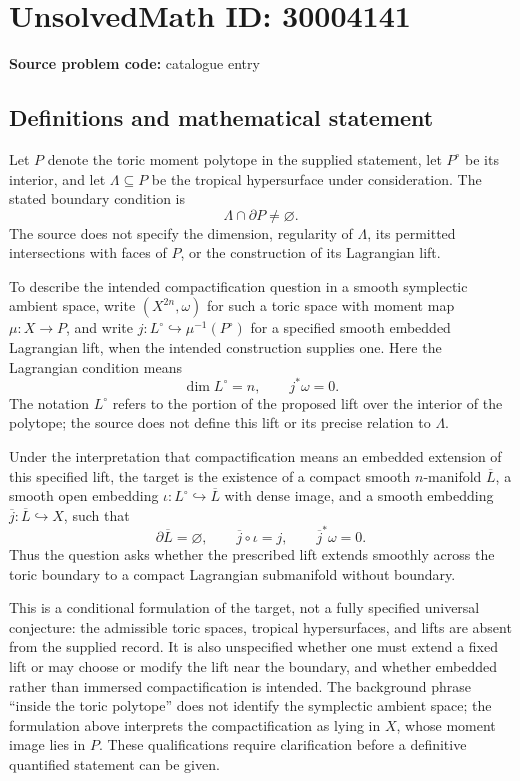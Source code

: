 \documentclass[11pt]{article}
\begin{document}
\section*{UnsolvedMath ID: 30004141}
\textbf{Source problem code:} catalogue entry
\subsection{Definitions and mathematical statement}
Let \(P\) denote the toric moment polytope in the supplied statement, let \(P^{\circ}\) be its interior, and let \(\Lambda\subseteq P\) be the tropical hypersurface under consideration. The stated boundary condition is
\[
\Lambda\cap\partial P\ne\varnothing.
\]
The source does not specify the dimension, regularity of \(\Lambda\), its permitted intersections with faces of \(P\), or the construction of its Lagrangian lift.

To describe the intended compactification question in a smooth symplectic ambient space, write \((X^{2n},\omega)\) for such a toric space with moment map \(\mu:X\to P\), and write \(j:L^{\circ}\hookrightarrow\mu^{-1}(P^{\circ})\) for a specified smooth embedded Lagrangian lift, when the intended construction supplies one. Here the Lagrangian condition means
\[
\dim L^{\circ}=n,\qquad j^{*}\omega=0.
\]
The notation \(L^{\circ}\) refers to the portion of the proposed lift over the interior of the polytope; the source does not define this lift or its precise relation to \(\Lambda\).

Under the interpretation that compactification means an embedded extension of this specified lift, the target is the existence of a compact smooth \(n\)-manifold \(\overline L\), a smooth open embedding \(\iota:L^{\circ}\hookrightarrow\overline L\) with dense image, and a smooth embedding \(\overline j:\overline L\hookrightarrow X\), such that
\[
\partial\overline L=\varnothing,\qquad
\overline j\circ\iota=j,\qquad
\overline j^{*}\omega=0.
\]
Thus the question asks whether the prescribed lift extends smoothly across the toric boundary to a compact Lagrangian submanifold without boundary.

This is a conditional formulation of the target, not a fully specified universal conjecture: the admissible toric spaces, tropical hypersurfaces, and lifts are absent from the supplied record. It is also unspecified whether one must extend a fixed lift or may choose or modify the lift near the boundary, and whether embedded rather than immersed compactification is intended. The background phrase ``inside the toric polytope'' does not identify the symplectic ambient space; the formulation above interprets the compactification as lying in \(X\), whose moment image lies in \(P\). These qualifications require clarification before a definitive quantified statement can be given.
\end{document}
